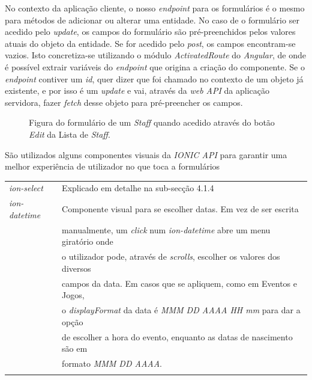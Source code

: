 No contexto da aplicação cliente, o nosso \textit{endpoint} para os formulários é o mesmo para métodos de adicionar ou alterar uma entidade. No caso de o formulário ser acedido pelo \textit{update}, os campos do formulário são pré-preenchidos pelos valores atuais do objeto da entidade. Se for acedido pelo \textit{post}, os campos encontram-se vazios.
Isto concretiza-se utilizando o módulo \textit{ActivatedRoute} do \textit{Angular}, de onde é possível extrair variáveis do \textit{endpoint} que origina a criação do componente. Se o \textit{endpoint} contiver um \textit{id}, quer dizer que foi chamado no contexto de um objeto já existente, e por isso é um \textit{update} e vai, através da \textit{web API} da aplicação servidora, fazer \textit{fetch} desse objeto para pré-preencher os campos.

\begin{figure}[h]
	\begin{center}
	\end{center}
	\caption{Figura do formulário de um \textit{Staff} quando acedido através do botão \textit{Edit} da Lista de \textit{Staff}.}\label{fig:formupdate}
\end{figure}


São utilizados alguns componentes visuais da \textit{IONIC API} para garantir uma melhor experiência de utilizador no que toca a formulários\\

\begin{tabular}{ll}
	\textit{ion-select} & Explicado em detalhe na sub-secção 4.1.4\\
	\textit{ion-datetime} & Componente visual para se escolher datas. Em vez de ser escrita \\
	&manualmente, um \textit{click} num \textit{ion-datetime} abre um menu giratório onde \\
	&o utilizador pode, através de \textit{scrolls}, escolher os valores dos diversos \\
	&campos da data. Em casos que se apliquem, como em Eventos e Jogos, \\
	&o \textit{displayFormat} da data é \textit{MMM DD AAAA HH mm} para dar a opção \\
	&de escolher a hora do evento, enquanto as datas de nascimento são em \\
	&formato \textit{MMM DD AAAA}.\\ 
	&\\
\end{tabular}


